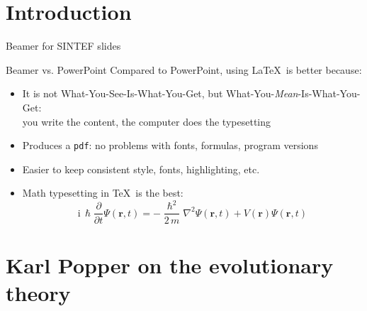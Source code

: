 \documentclass{sintefbeamer}
\begin{document}
\section{Introduction}

\begin{frame}{Beamer for SINTEF slides}{\thesection \, \secname}

\end{frame}

\begin{frame}{Beamer vs. PowerPoint}
Compared to PowerPoint, using \LaTeX\ is better because:
\begin{itemize}
\item It is not What-You-See-Is-What-You-Get, but
What-You-\emph{Mean}-Is-What-You-Get:\\
you write the content, the computer does the typesetting
\item Produces a \texttt{pdf}: no problems with fonts, formulas,
      program versions
\item Easier to keep consistent style, fonts, highlighting, etc.
\item Math typesetting in \TeX\ is the best:
\begin{equation*}
\mathrm{i}\,\hslash\frac{\partial}{\partial t} \Psi(\mathbf{r},t) =
-\frac{\hslash^2}{2\,m}\nabla^2\Psi(\mathbf{r},t)
+ V(\mathbf{r})\Psi(\mathbf{r},t)
\end{equation*}

\end{itemize}
\end{frame}

\section{Karl Popper on the evolutionary theory}

\end{document}
